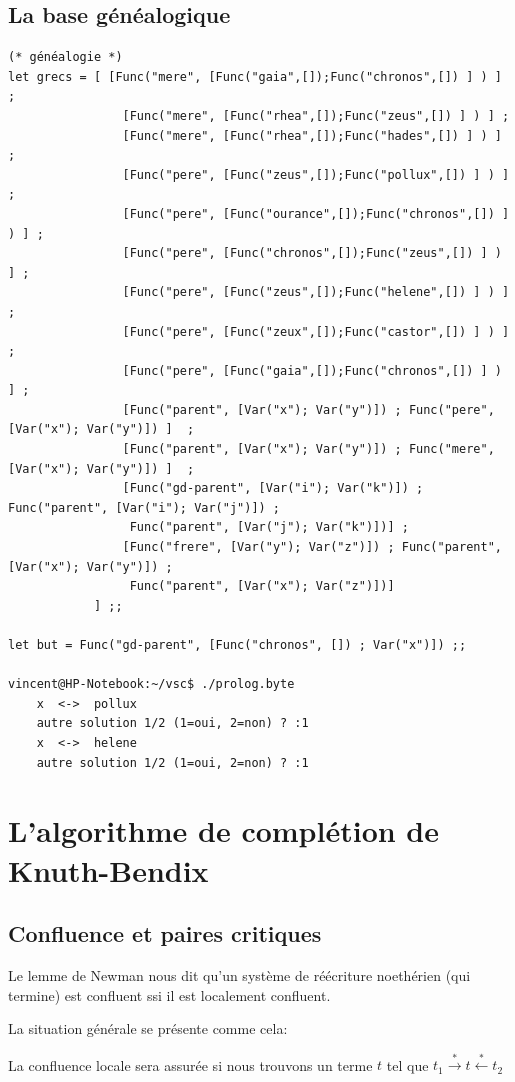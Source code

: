 \documentclass[11pt]{book}
\begin{document}
\subsection{La base généalogique}
\begin{Verbatim}
(* généalogie *)
let grecs = [ [Func("mere", [Func("gaia",[]);Func("chronos",[]) ] ) ] ;
				[Func("mere", [Func("rhea",[]);Func("zeus",[]) ] ) ] ;
				[Func("mere", [Func("rhea",[]);Func("hades",[]) ] ) ] ;
				[Func("pere", [Func("zeus",[]);Func("pollux",[]) ] ) ] ;
				[Func("pere", [Func("ourance",[]);Func("chronos",[]) ] ) ] ;
				[Func("pere", [Func("chronos",[]);Func("zeus",[]) ] ) ] ;
				[Func("pere", [Func("zeus",[]);Func("helene",[]) ] ) ] ;
				[Func("pere", [Func("zeux",[]);Func("castor",[]) ] ) ] ;
				[Func("pere", [Func("gaia",[]);Func("chronos",[]) ] ) ] ;
				[Func("parent", [Var("x"); Var("y")]) ; Func("pere", [Var("x"); Var("y")]) ]  ;
				[Func("parent", [Var("x"); Var("y")]) ; Func("mere", [Var("x"); Var("y")]) ]  ;
				[Func("gd-parent", [Var("i"); Var("k")]) ; Func("parent", [Var("i"); Var("j")]) ; 
				 Func("parent", [Var("j"); Var("k")])] ;
				[Func("frere", [Var("y"); Var("z")]) ; Func("parent", [Var("x"); Var("y")]) ; 
				 Func("parent", [Var("x"); Var("z")])]  							
			] ;;

let but = Func("gd-parent", [Func("chronos", []) ; Var("x")]) ;;
	
vincent@HP-Notebook:~/vsc$ ./prolog.byte 
	x  <->  pollux 
	autre solution 1/2 (1=oui, 2=non) ? :1
	x  <->  helene 
	autre solution 1/2 (1=oui, 2=non) ? :1
\end{Verbatim}

\section{L'algorithme de complétion de Knuth-Bendix}
\subsection{Confluence et paires critiques}
Le lemme de Newman nous dit qu'un système de réécriture noethérien (qui termine) est confluent 
ssi il est localement confluent.

La situation générale se présente comme cela:
\begin{center}
\end{center}
La confluence locale sera assurée si nous trouvons un terme $t$ tel que 
$t_1 \overset{*}{\rightarrow} t \overset{*}{\leftarrow} t_2$ 
\end{document}
